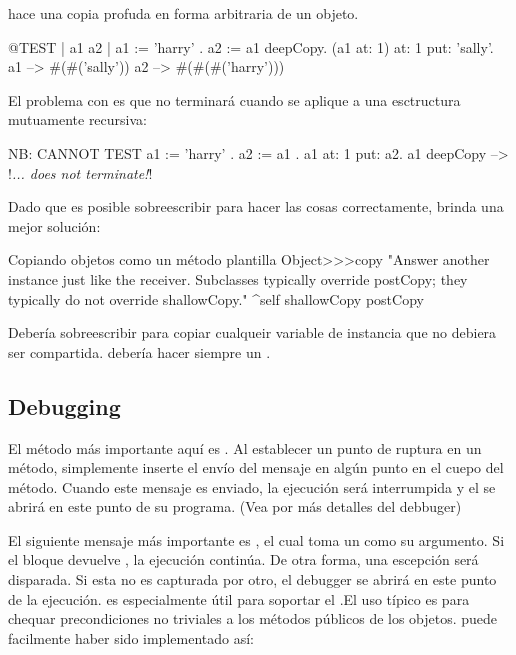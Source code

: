 \documentclass[a4paper,10pt,twoside]{book}
\begin{document}
 hace una copia profuda en forma arbitraria de un objeto.

\begin{code}{@TEST | a1 a2 |}
a1 := { { { 'harry' } } } .
a2 := a1 deepCopy.
(a1 at: 1) at: 1 put: 'sally'.
a1 --> #(#('sally'))
a2 --> #(#(#('harry')))
\end{code}

El problema con  es que no terminar\'a cuando se aplique a una esctructura mutuamente recursiva:

\begin{code}{NB: CANNOT TEST}
a1 := { 'harry' }.
a2 := { a1 }.
a1 at: 1 put: a2.
a1 deepCopy --> !\emph{... does not terminate!}!
\end{code}

Dado que es posible sobreescribir  para hacer las cosas correctamente,   brinda una mejor soluci\'on:

\begin{method}{Copiando objetos como un m\'etodo plantilla}
Object>>>copy
    "Answer another instance just like the receiver.
    Subclasses typically override postCopy;
    they typically do not override shallowCopy."
    ^self shallowCopy postCopy
\end{method}

Deber\'ia sobreescribir  para copiar cualqueir variable de instancia que no debiera ser compartida.  deber\'ia hacer siempre un .



\subsection{Debugging}

El m\'etodo m\'as importante aqu\'i es . Al establecer un punto de ruptura en un m\'etodo, simplemente inserte el env\'io del mensaje  en alg\'un punto en el cuepo del m\'etodo. Cuando este mensaje es enviado, la ejecuci\'on ser\'a interrumpida y el  se abrir\'a en este punto de su programa.
(Vea  por m\'as detalles del debbuger)


El siguiente mensaje m\'as importante es  , el cual toma un  como su argumento. Si el bloque devuelve , la ejecuci\'on contin\'ua. De otra forma, una escepci\'on  ser\'a disparada. Si esta no es capturada por otro, el debugger se abrir\'a en este punto de la ejecuci\'on.  es especialmente \'util para soportar el .El uso t\'ipico es para chequar precondiciones no triviales a los m\'etodos p\'ublicos de los objetos.  puede facilmente haber sido implementado as\'i:
\end{document}
